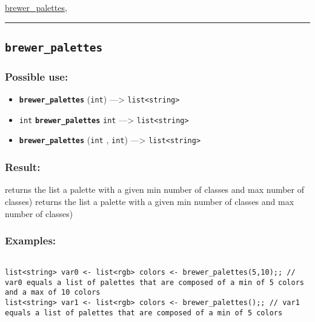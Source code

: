 \documentclass[]{book}
\providecommand{\tightlist}{%
  \setlength{\itemsep}{0pt}\setlength{\parskip}{0pt}}
\theoremstyle{definition}
\theoremstyle{definition}
\theoremstyle{definition}
\theoremstyle{remark}
\begin{document}
\href{OperatorsBC\#brewer_palettes}{brewer\_palettes},

\begin{center}\rule{0.5\linewidth}{\linethickness}\end{center}

\subsection{\texorpdfstring{\texttt{brewer\_palettes}}{brewer\_palettes}}\label{brewer_palettes}

\subsubsection{Possible use:}\label{possible-use-78}

\begin{itemize}
\tightlist
\item
  \textbf{\texttt{brewer\_palettes}} (\texttt{int}) ---\textgreater{}
  \texttt{list\textless{}string\textgreater{}}
\item
  \texttt{int} \textbf{\texttt{brewer\_palettes}} \texttt{int}
  ---\textgreater{} \texttt{list\textless{}string\textgreater{}}
\item
  \textbf{\texttt{brewer\_palettes}} (\texttt{int} , \texttt{int})
  ---\textgreater{} \texttt{list\textless{}string\textgreater{}}
\end{itemize}

\subsubsection{Result:}\label{result-77}

returns the list a palette with a given min number of classes and max
number of classes) returns the list a palette with a given min number of
classes and max number of classes)

\subsubsection{Examples:}\label{examples-60}

\begin{verbatim}
 
list<string> var0 <- list<rgb> colors <- brewer_palettes(5,10);; // var0 equals a list of palettes that are composed of a min of 5 colors and a max of 10 colors 
list<string> var1 <- list<rgb> colors <- brewer_palettes();; // var1 equals a list of palettes that are composed of a min of 5 colors
\end{verbatim}
\end{document}

